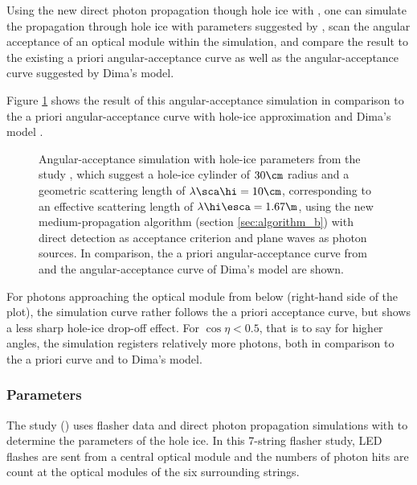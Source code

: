 Using the new direct photon propagation though hole ice with \clsim, one can simulate the propagation through hole ice with parameters suggested by , scan the angular acceptance of an optical module within the simulation, and compare the result to the existing a priori angular-acceptance curve as well as the angular-acceptance curve suggested by Dima's model.


Figure \ref{fig:eePai1sh} shows the result of this angular-acceptance simulation in comparison to the a priori angular-acceptance curve with hole-ice approximation \cite{icepaper} and Dima's model \cite{flasherdataderivedicemodels}.

\begin{figure}[htbp]
  \caption{Angular-acceptance simulation with hole-ice parameters from the  study \cite{martindardupdate}, which suggest a hole-ice cylinder of $30\cm$ radius and a geometric scattering length of $\lambda\sca\hi = 10\cm$, corresponding to an effective scattering length of $\lambda\hi\esca = 1.67\m$, using the new medium-propagation algorithm (section \ref{sec:algorithm_b}) with direct detection as acceptance criterion and plane waves as photon sources. In comparison, the a priori angular-acceptance curve from \cite{icepaper} and the angular-acceptance curve of Dima's model \cite{flasherdataderivedicemodels} are shown.}
  \label{fig:eePai1sh}
\end{figure}

For photons approaching the optical module from below (right-hand side of the plot), the simulation curve rather follows the a priori acceptance curve, but shows a less sharp hole-ice drop-off effect. For $\cos\eta < 0.5$, that is to say for higher angles, the simulation registers relatively more photons, both in comparison to the a priori curve and to Dima's model.


\subsubsection{ Parameters}
\label{sec:spicehd_parameters}

The  study () uses flasher data and direct photon propagation simulations with \ppc to determine the parameters of the hole ice. In this 7-string flasher study, LED flashes are sent from a central optical module and the numbers of photon hits are count at the optical modules of the six surrounding strings.

